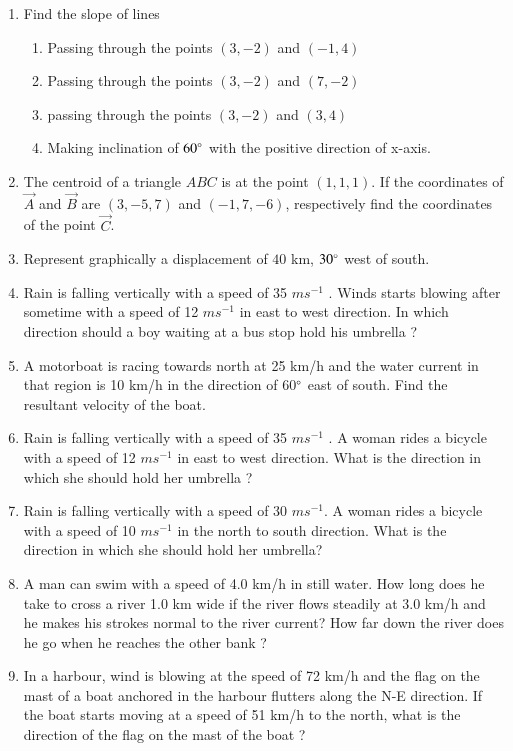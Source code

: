 \begin{enumerate}[label=\thesubsection.\arabic*, ref=\thesubsection.\theenumi]
\item Find the slope of lines
\begin{enumerate}
\item  Passing through the points $(3, -2)$ and $(-1, 4)$
\item  Passing through the points $(3, -2)$ and $(7, -2)$
\item  passing through the points $(3, -2)$ and $(3, 4)$	
\item  Making inclination of $60\degree$ with the positive direction of x-axis.
\end{enumerate}
\item The centroid of a triangle $ABC$ is at the point $(1, 1, 1)$. If the coordinates of $\vec{A}$ and $\vec{B}$ are $(3, -5, 7)$ and $(-1, 7, -6)$,  respectively find the coordinates of the point $\vec{C}$.
\item Represent graphically a displacement of $40$ km,  $30\degree$ west of south.
	\item Rain is falling vertically with a speed of 35 $m s^{-1}$
. Winds starts blowing after sometime with a speed of 12 $m s^{-1}$ in
east to west direction. In which direction should a boy waiting at a bus stop hold his umbrella ?
%
\item A motorboat is racing towards north at 25 km/h and the water current in that region is 10 km/h in the direction of 60$\degree$ east of south. Find the resultant velocity of the boat.
\item Rain is falling vertically with a speed of 35 $m s^{-1}$
. A woman rides a bicycle with a speed of 12 $ms^{-1}$ in east to west
direction. What is the direction in which she should hold her umbrella ?
\item Rain is falling vertically with a speed of 30 $m s^{-1}$. A woman rides a bicycle with a speed  of 10 $m s^{-1}$ in the north to south direction. What is the direction in which she should
hold her umbrella?
\item A man can swim with a speed of 4.0 km/h in still water. How long does he take to cross a river 1.0 km wide if the river flows steadily at 3.0 km/h and he makes his strokes normal to the river current? How far down the river does he go when he reaches the other bank ?
\item In a harbour,  wind is blowing at the speed of 72 km/h and the flag on the mast of a boat anchored in the harbour flutters along the N-E direction. If the boat starts moving at a speed of 51 km/h to the north,  what is the direction of the flag on the mast of the boat ?

\end{enumerate}
